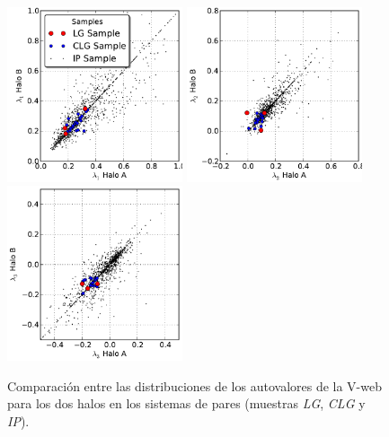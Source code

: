 \
\begin{figure}[htbp]
	\centering
	\includegraphics[width=0.46\textwidth]
	{./figures/4_results/CLG_L11_L12.pdf}
	\includegraphics[width=0.46\textwidth]
	{./figures/4_results/CLG_L21_L22.pdf}
	\includegraphics[width=0.46\textwidth]
	{./figures/4_results/CLG_L31_L32.pdf}

	\caption{\small{Comparación entre las distribuciones de los autovalores de 
	la V-web para los dos halos en los sistemas de pares (muestras \textit{LG},
	\textit{CLG} y \textit{IP}).}}
	\label{fig:Lambda_Comparison_Pairs}
\end{figure}


